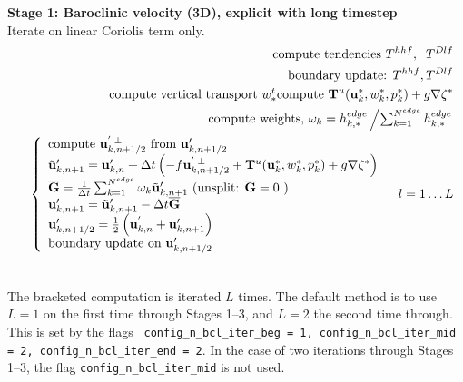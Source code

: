 \documentclass[11pt]{report}
\begin{document}
{\bf Stage 1: Baroclinic velocity (3D), explicit with long timestep}\\
Iterate on linear Coriolis term only.
\begin{eqnarray} &&
\mbox{compute tendencies } T^{hhf}, \;\;T^{Dlf} \\ && \hspace{.5cm}
\mbox{boundary update: } T^{hhf},T^{Dlf}\\&& \hspace{.5cm}
\mbox{compute vertical transport $w^t_*$} 
\mbox{compute } {\bf T}^u({\bf u}_k^*,w_k^*,p_k^*) +g\nabla \zeta^* \\ &&
\mbox{compute weights, }\omega_k  =  h_{k,*}^{edge}
\left/\textstyle\sum_{k=1}^{N^{edge}} h_{k,*}^{edge}
\right.\\ &&
\left\{\begin{array}{l} \label{u bcl s2} 
\mbox{compute }{\bf u}_{k,n+1/2}^{'\;\perp}\mbox{ from }{\bf u}_{k,n+1/2}'\\ 
{\tilde {\bf u}}'_{k,n+1} = {\bf u}'_{k,n} + \Delta t 
\left( -f{\bf u}_{k,n+1/2}^{'\;\perp} + {\bf T}^u({\bf u}_k^*,w_k^*,p_k^*) 
+g\nabla \zeta^* \right)
\\  
{\overline {\bf G}} = 
\frac{1}{\Delta t}
\sum_{k=1}^{N^{edge}} \omega_k {\tilde {\bf u}}'_{k,n+1}
\mbox{ (unsplit: ${\overline {\bf G}} =0$ )}
\\ 
{\bf u}'_{k,n+1} = {\tilde {\bf u}}'_{k,n+1} - \Delta t {\overline {\bf G}}
\\
{\bf u}'_{k,n+1/2} = \frac{1}{2}\left({\bf u}^{'}_{k,n} +{\bf u}'_{k,n+1}\right) 
\\
\mbox{boundary update on }{\bf u}'_{k,n+1/2}
\end{array}
\right. \;\;\; l=1\ldots L \\ &&
\end{eqnarray}

The bracketed computation is iterated $L$ times.  The default method is to use $L=1$ on the first time through Stages 1--3, and $L=2$ the second time through.  This is set by the flags {\tt
config\_n\_bcl\_iter\_beg = 1, config\_n\_bcl\_iter\_mid = 2, config\_n\_bcl\_iter\_end = 2}.
In the case of two iterations through Stages 1--3, the flag {\tt config\_n\_bcl\_iter\_mid} is not used.
\end{document}
